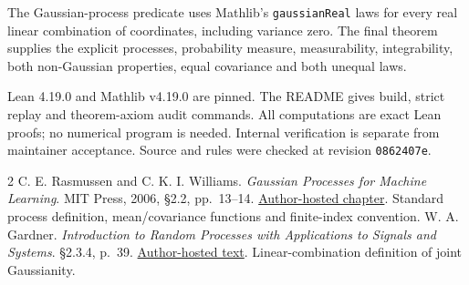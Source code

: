 \documentclass[10pt]{article}
\begin{document}
The Gaussian-process predicate uses Mathlib's \texttt{gaussianReal} laws for every real linear combination of coordinates, including variance zero. The final theorem supplies the explicit processes, probability measure, measurability, integrability, both non-Gaussian properties, equal covariance and both unequal laws.

Lean 4.19.0 and Mathlib v4.19.0 are pinned. The README gives build, strict replay and theorem-axiom audit commands. All computations are exact Lean proofs; no numerical program is needed. Internal verification is separate from maintainer acceptance. Source and rules were checked at revision \texttt{0862407e}.

\begin{thebibliography}{2}\small
{} C. E. Rasmussen and C. K. I. Williams. \emph{Gaussian Processes for Machine Learning}. MIT Press, 2006, \S2.2, pp.~13--14. \href{https://gaussianprocess.org/gpml/chapters/RW2.pdf}{Author-hosted chapter}. Standard process definition, mean/covariance functions and finite-index convention.
 W. A. Gardner. \emph{Introduction to Random Processes with Applications to Signals and Systems}. \S2.3.4, p.~39. \href{https://faculty.engineering.ucdavis.edu/gardner/wp-content/uploads/sites/146/2014/05/Introduction_to_Random_Processes_with_applications_to_Signal.pdf}{Author-hosted text}. Linear-combination definition of joint Gaussianity.
\end{thebibliography}
\end{document}
